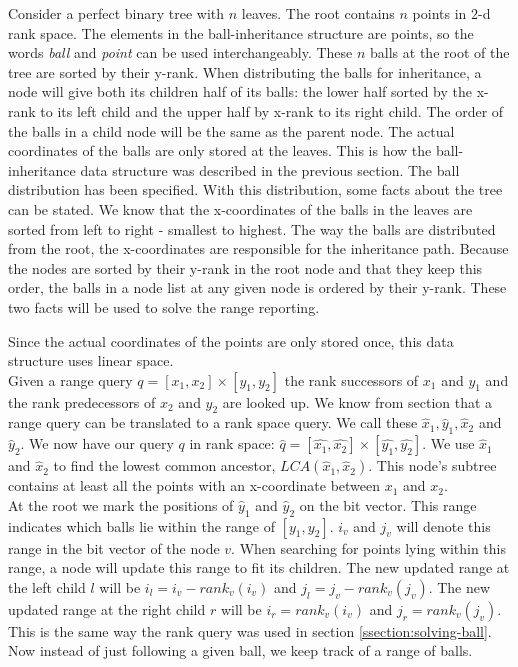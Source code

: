 Consider a perfect binary tree with $n$ leaves. The root contains $n$ points in $2$-d rank space. The elements in the ball-inheritance structure are points, so the words \emph{ball} and \emph{point} can be used interchangeably. These $n$ balls at the root of the tree are sorted by their y-rank. When distributing the balls for inheritance, a node will give both its children half of its balls: the lower half sorted by the x-rank to its left child and the upper half by x-rank to its right child. The order of the balls in a child node will be the same as the parent node. The actual coordinates of the balls are only stored at the leaves. This is how the ball-inheritance data structure was described in the previous section. The ball distribution has been specified. With this distribution, some facts about the tree can be stated. We know that the x-coordinates of the balls in the leaves are sorted from left to right - smallest to highest. The way the balls are distributed from the root, the x-coordinates are responsible for the inheritance path.  Because the nodes are sorted by their y-rank in the root node and that they keep this order, the balls in a node list at any given node is ordered by their y-rank. These two facts will be used to solve the range reporting.

Since the actual coordinates of the points are only stored once, this data structure uses linear space. \\

Given a range query $q = [x_1, x_2] \times [y_1, y_2]$ the rank successors of $x_1$ and $y_1$ and the rank predecessors of $x_2$ and $y_2$ are looked up. We know from section  that a range query can be translated to a rank space query. We call these $\hat{x}_1, \hat{y}_1, \hat{x}_2$ and $\hat{y}_2$. We now have our query $q$ in rank space: $\hat{q} = [\hat{x_1}, \hat{x_2}] \times [\hat{y_1}, \hat{y_2}]$. We use $\hat{x}_1$ and $\hat{x}_2$ to find the lowest common ancestor, $LCA(\hat{x}_1, \hat{x}_2)$. This node's subtree contains at least all the points with an x-coordinate between $x_1$ and $x_2$. \\

At the root we mark the positions of $\hat{y}_1$ and $\hat{y}_2$ on the bit vector. This range indicates which balls lie within the range of $[y_1, y_2]$. $i_v$ and $j_v$ will denote this range in the bit vector of the node $v$. When searching for points lying within this range, a node will update this range to fit its children. The new updated range at the left child $l$ will be $i_l = i_v - rank_v(i_v)$ and $j_l = j_v - rank_v(j_v)$. The new updated range at the right child $r$ will be $i_r = rank_v(i_v)$ and $j_r = rank_v(j_v)$. This is the same way the rank query was used in section \ref{ssection:solving-ball}. Now instead of just following a given ball, we keep track of a range of balls. \\

